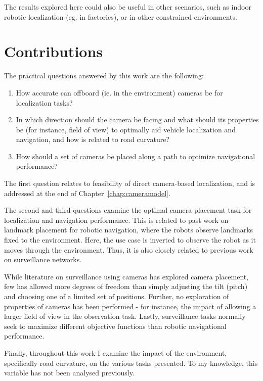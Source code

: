 \documentclass[a4paper,12pt,twoside,openright]{report}
\begin{document}
The results explored here could also be useful in other scenarios, such as indoor
robotic localization (eg. in factories), or in other constrained environments.

\section{Contributions}

The practical questions answered by this work are the following:
\begin{enumerate}
    \item How accurate can offboard (ie. in the environment) cameras be for localization tasks?
    \item In which direction should the camera be facing and what should its properties be (for instance, field of view)
          to optimally aid vehicle localization and navigation, and how is related to road curvature?
    \item How should a set of cameras be placed along a path to optimize navigational performance?
\end{enumerate}

The first question relates to feasibility of direct camera-based localization,
and is addressed at the end of Chapter~\ref{chap:cameramodel}.

The second and third questions examine the optimal camera placement task 
for localization and navigation performance. This is related to past work 
on landmark placement for robotic navigation, where the robots observe landmarks fixed to the environment. 
Here, the use case is inverted to observe the robot as it moves through the environment. 
Thus, it is also closely related to previous work on surveillance networks.

While literature on surveillance using cameras has explored camera placement, few
has allowed more degrees of freedom than simply adjusting the tilt (pitch) 
and choosing one of a limited set of positions. Further, no exploration of 
properties of cameras has been performed - for instance, the impact
of allowing a larger field of view in the observation task. Lastly, surveillance
tasks normally seek to maximize different objective functions than robotic
navigational performance.

Finally, throughout this work I examine the impact of the environment, specifically
road curvature, on the various tasks presented. To my knowledge, this variable has not been
analysed previously.
\end{document}
